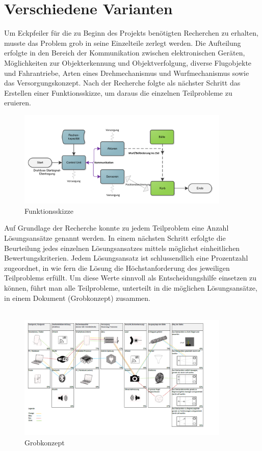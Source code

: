 ﻿\section{Verschiedene Varianten}
Um Eckpfeiler für die zu Beginn des Projekts benötigten Recherchen zu erhalten, musste das Problem grob in seine Einzelteile zerlegt werden. Die Aufteilung erfolgte in den Bereich der Kommunikation zwischen elektronischen Geräten, Möglichkeiten zur Objekterkennung und Objektverfolgung, diverse Flugobjekte und Fahrantriebe, Arten eines Drehmechanismus und Wurfmechanismus sowie das Versorgungskonzept. 
Nach der Recherche folgte als nächster Schritt das Erstellen einer Funktionsskizze, um daraus die einzelnen Teilprobleme zu eruieren.
\begin{figure}[h!]
	\centering
	\includegraphics[width=0.9\textwidth]{Enddokumentation/Varianten/Bilder/Funktionsskizze.png}
	\caption{Funktionsskizze}
	\label{fig:Funktionsskizze}
\end{figure}
Auf Grundlage der Recherche konnte zu jedem Teilproblem eine Anzahl Lösungsansätze genannt werden. In einem nächsten Schritt erfolgte die Beurteilung jedes einzelnen Lösungsansatzes mittels möglichst einheitlichen Bewertungskriterien. Jedem Lösungsansatz ist schlussendlich eine Prozentzahl zugeordnet, in wie fern die Lösung die Höchstanforderung des jeweiligen Teilproblems erfüllt. Um diese Werte sinnvoll als Entscheidungshilfe einsetzen zu können, führt man alle Teilprobleme, unterteilt in die möglichen Lösungsansätze, in einem Dokument (Grobkonzept) zusammen. \\
\\
\begin{figure}
	\centering
	\includegraphics[width=0.9\textwidth]{Enddokumentation/Varianten/Bilder/Grobkonzept.png}
	\caption{Grobkonzept}
	\label{fig:Grobkonzept}
\end{figure}
